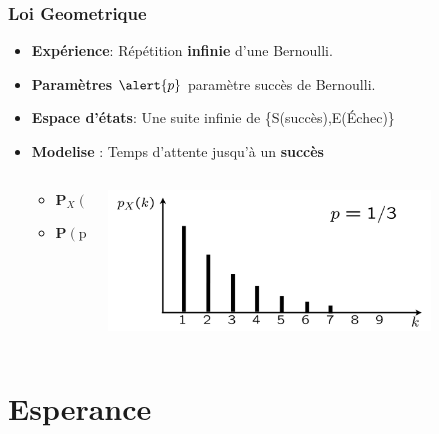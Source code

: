 \documentclass{beamer}
\begin{document}
\begin{frame}[t]
  \frametitle{Loi Geometrique}
  \textbf{}
  \begin{itemize}
    \scriptsize
    \item \textbf{Expérience}: Répétition \alert{\textbf{infinie}} d'une
      Bernoulli.\\[8pt]
    \item \textbf{Paramètres} $\alert{p}$ paramètre succès de Bernoulli.
    \item \textbf{Espace d'états}: Une suite infinie de
      \{S(succès),E(Échec)\}\\[8pt]
    \item \textbf{Modelise} : Temps d'attente jusqu'à un
      \alert{\textbf{succès}}\\[12pt]

    \pause
    \begin{columns}
      \begin{column}{0.5\textwidth}
      \begin{itemize}
        \item $\mathbf{P}_X(k) =$ \\[2cm]
        \item $\mathbf{P}(\text{pas de succès})$ 
      \end{itemize}
      \end{column}
      \begin{column}{0.5\textwidth}
          \centering
          \includegraphics[width=0.8\textwidth]{./geometric.png}
      \end{column}
    \end{columns}
  \end{itemize}
\end{frame}
\section{Esperance}
\end{document}
